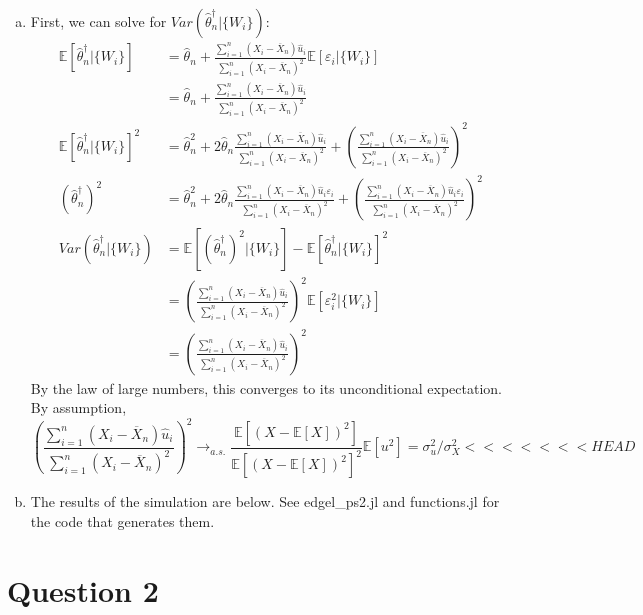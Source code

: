 \documentclass{article}
\newcommand{\olx}[1]{\overline{X}_{#1}}
\newcommand{\sumn}{\sum_{i=1}^{n}}
\newcommand{\eps}{\varepsilon}
\newcommand{\that}{\hat{\theta}_n}
\newcommand{\tchat}{\that^\dagger}
\newcommand{\E}[1]{\mathbb{E}\left[#1\right]}%
\begin{document}
\begin{enumerate}[(a)]
    \item First, we can solve for ${Var(\tchat|\{W_i\})}$:\begin{align*}
        \E{\tchat|\{W_i\}} &= \that + \frac{\sumn(X_i - \olx{n})\hat{u}_i}{\sumn(X_i - \olx{n})^2}\E{\eps_i|\{W_i\}} \\
                    &= \that + \frac{\sumn(X_i - \olx{n})\hat{u}_i}{\sumn(X_i - \olx{n})^2}  \\
        \E{\tchat|\{W_i\}}^2 &=  \that^2 + 2\that\frac{\sumn(X_i - \olx{n})\hat{u}_i}{\sumn(X_i - \olx{n})^2} + \left(\frac{\sumn(X_i - \olx{n})\hat{u}_i}{\sumn(X_i - \olx{n})^2}\right)^2    \\
        (\tchat)^2 &= \that^2 + 2\that\frac{\sumn(X_i - \olx{n})\hat{u}_i\eps_i}{\sumn(X_i - \olx{n})^2} + \left(\frac{\sumn(X_i - \olx{n})\hat{u}_i\eps_i}{\sumn(X_i - \olx{n})^2}\right)^2   \\
        Var(\tchat|\{W_i\}) &= \E{(\tchat)^2|\{W_i\}} - \E{\tchat|\{W_i\}}^2 \\
            &= \left(\frac{\sumn(X_i - \olx{n})\hat{u}_i}{\sumn(X_i - \olx{n})^2}\right)^2\E{\eps_i^2|\{W_i\}}    \\
            &= \left(\frac{\sumn(X_i - \olx{n})\hat{u}_i}{\sumn(X_i - \olx{n})^2}\right)^2
    \end{align*}
    By the law of large numbers, this converges to its unconditional expectation. By assumption,\[
        \left(\frac{\sumn(X_i - \olx{n})\hat{u}_i}{\sumn(X_i - \olx{n})^2}\right)^2 \rightarrow_{a.s.} \frac{\E{(X-\E{X})^2}}{\E{(X-\E{X})^2}^2}\E{u^2} = \sigma_u^2/\sigma_X^2
<<<<<<< HEAD
    \]

    \item The results of the simulation are below. See edgel\_ps2.jl and functions.jl for the code that generates them.
        \begin{center}
            
        \end{center}
\end{enumerate}
\pagebreak
\section*{Question 2}
\end{document}
